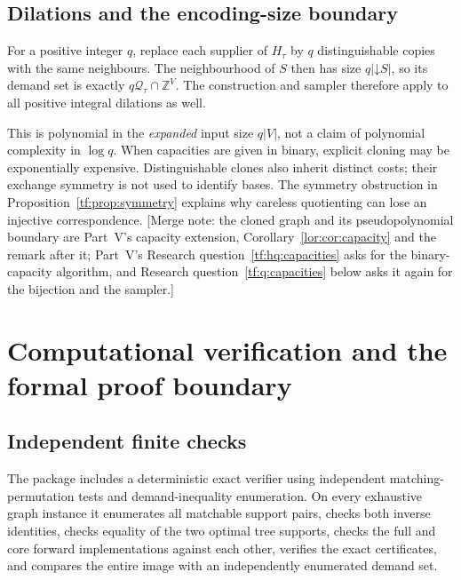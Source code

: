 \documentclass[11pt]{article}
\numberwithin{equation}{section}
\theoremstyle{definition}
\newcommand{\Z}{\mathbb Z}
\newcommand{\Qt}{\mathcal Q_\tau}
\begin{document}
\subsection{Dilations and the encoding-size boundary}
For a positive integer $q$, replace each supplier of $H_\tau$ by $q$
distinguishable copies with the same neighbours. The neighbourhood of $S$
then has size $q|\mathord\downarrow S|$, so its demand set is exactly
$q\Qt\cap\Z^V$. The construction and sampler therefore apply to all
positive integral dilations as well.

This is polynomial in the \emph{expanded} input size $q|V|$, not a claim
of polynomial complexity in $\log q$. When capacities are given in binary,
explicit cloning may be exponentially expensive. Distinguishable clones
also inherit distinct costs; their exchange symmetry is not used to
identify bases. The symmetry obstruction in
Proposition~\ref{tf:prop:symmetry} explains why careless quotienting can
lose an injective correspondence.
[Merge note: the cloned graph and its pseudopolynomial boundary are
Part~V's capacity extension, Corollary~\ref{lor:cor:capacity} and the
remark after it; Part~V's Research question~\ref{tf:hq:capacities} asks
for the binary-capacity algorithm, and Research
question~\ref{tf:q:capacities} below asks it again for the bijection and
the sampler.]

\section{Computational verification and the formal proof boundary}
\label{tf:sec:formal}

\subsection{Independent finite checks}
The package includes a deterministic exact verifier using independent
matching-permutation tests and demand-inequality enumeration. On every
exhaustive graph instance it enumerates all matchable support pairs,
checks both inverse identities, checks equality of the two optimal tree
supports, checks the full and core forward implementations against each
other, verifies the exact certificates, and compares the entire image
with an independently enumerated demand set.
\end{document}
